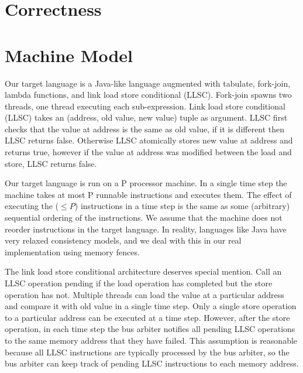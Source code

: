 \documentclass[preprint]{sigplanconf}
\begin{document}
\section{Correctness}

\section{Machine Model}

Our target language is a Java-like language augmented with tabulate, fork-join, lambda functions, and link load store conditional (LLSC). Fork-join spawns two threads, one thread executing each sub-expression. Link load store conditional (LLSC) takes an (address, old value, new value) tuple as argument. LLSC first checks that the value at address is the same as old value, if it is different then LLSC returns false. Otherwise LLSC atomically stores new value at address and returns true, however if the value at address was modified between the load and store, LLSC returns false.

Our target language is run on a P processor machine. In a single time step the machine takes at most P runnable instructions and executes them.  The effect of executing the ($\leq P$) instructions in a time step is the same as some (arbitrary) sequential ordering of the instructions. We assume that the machine does not reorder instructions in the target language. In reality, languages like Java have very relaxed consistency models, and we deal with this in our real implementation using memory fences.

The link load store conditional architecture deserves special mention. Call an LLSC operation pending if the load operation has completed but the store operation has not. Multiple threads can load the value at a particular address and compare it with old value in a single time step. Only a single store operation to a particular address can be executed at a time step. However, after the store operation, in each time step the bus arbiter notifies all pending LLSC operations to the same memory address that they have failed. This assumption is reasonable because all LLSC instructions are typically processed by the bus arbiter, so the bus arbiter can keep track of pending LLSC instructions to each memory address.







\end{document}
